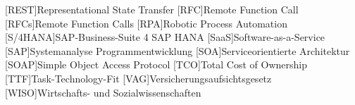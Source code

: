 \begin{acronym}[XXXXXXX]
	[REST]{Representational State Transfer}
	[RFC]{Remote Function Call}
	[RFCs]{Remote Function Calls}
	[RPA]{Robotic Process Automation}
	[S/4HANA]{SAP-Business-Suite 4 SAP HANA}
	[SaaS]{Software-as-a-Service}
	[SAP]{Systemanalyse Programmentwicklung}
	[SOA]{Serviceorientierte Architektur}
	[SOAP]{Simple Object Access Protocol}
	[TCO]{Total Cost of Ownership}
	[TTF]{Task-Technology-Fit}
	[VAG]{Versicherungsaufsichtsgesetz}
	[WISO]{Wirtschafts- und Sozialwissenschaften}
\end{acronym}